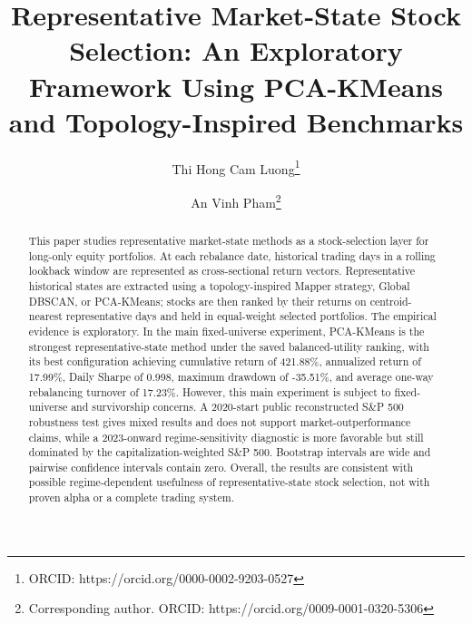 \documentclass[runningheads]{llncs}
\begin{document}
\title{Representative Market-State Stock Selection: An Exploratory Framework Using PCA-KMeans and Topology-Inspired Benchmarks}

\author{
Thi Hong Cam Luong\thanks{ORCID: https://orcid.org/0000-0002-9203-0527}
\and
An Vinh Pham\thanks{Corresponding author. ORCID: https://orcid.org/0009-0001-0320-5306}
}


\maketitle

\begin{abstract}
This paper studies representative market-state methods as a stock-selection layer for long-only equity portfolios. At each rebalance date, historical trading days in a rolling lookback window are represented as cross-sectional return vectors. Representative historical states are extracted using a topology-inspired Mapper strategy, Global DBSCAN, or PCA-KMeans; stocks are then ranked by their returns on centroid-nearest representative days and held in equal-weight selected portfolios. The empirical evidence is exploratory. In the main fixed-universe experiment, PCA-KMeans is the strongest representative-state method under the saved balanced-utility ranking, with its best configuration achieving cumulative return of 421.88\%, annualized return of 17.99\%, Daily Sharpe of 0.998, maximum drawdown of -35.51\%, and average one-way rebalancing turnover of 17.23\%. However, this main experiment is subject to fixed-universe and survivorship concerns. A 2020-start public reconstructed S\&P 500 robustness test gives mixed results and does not support market-outperformance claims, while a 2023-onward regime-sensitivity diagnostic is more favorable but still dominated by the capitalization-weighted S\&P 500. Bootstrap intervals are wide and pairwise confidence intervals contain zero. Overall, the results are consistent with possible regime-dependent usefulness of representative-state stock selection, not with proven alpha or a complete trading system.

\end{abstract}
\end{document}
